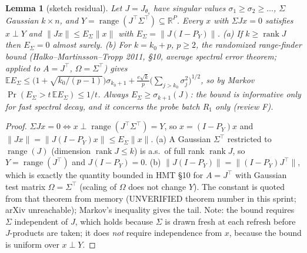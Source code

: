 \documentclass[11pt]{article}
\newtheorem{lemma}[proposition]{Lemma}
\theoremstyle{remark}
\begin{document}
\begin{lemma}[sketch residual]\label{l:sketch}
Let $J=J_{\theta_s}$ have singular values $\sigma_1\ge\sigma_2\ge\dots$, $\Sigma$ Gaussian $k\times n$, and $Y=\operatorname{range}(J^\top\Sigma^\top)\subseteq\mathbb{R}^P$. Every $x$ with $\Sigma Jx=0$ satisfies $x\perp Y$ and
$\|Jx\|\le E_\Sigma\|x\|$ with $E_\Sigma=\|J(I-P_Y)\|$. (a) If $k\ge\operatorname{rank}J$ then $E_\Sigma=0$ almost surely.
(b) For $k=k_0+p$, $p\ge2$, the randomized range-finder bound (Halko--Martinsson--Tropp 2011, \S10, average spectral error
theorem; applied to $A=J^\top$, $\Omega=\Sigma^\top$) gives
$\mathbb{E}E_\Sigma\le\bigl(1+\sqrt{k_0/(p-1)}\bigr)\sigma_{k_0+1}+\frac{e\sqrt{k}}{p}\bigl(\sum_{j>k_0}\sigma_j^2\bigr)^{1/2}$,
so by Markov $\Pr(E_\Sigma>t\,\mathbb{E}E_\Sigma)\le1/t$. Always $E_\Sigma\ge\sigma_{k+1}(J)$: the bound is informative only for fast spectral decay, and it concerns the probe batch $R_1$ only (review F).
\end{lemma}
\begin{proof}
$\Sigma Jx=0\iff x\perp\operatorname{range}(J^\top\Sigma^\top)=Y$, so $x=(I-P_Y)x$ and $\|Jx\|=\|J(I-P_Y)x\|\le E_\Sigma\|x\|$.
(a) A Gaussian $\Sigma^\top$ restricted to $\operatorname{range}(J)$ (dimension $\operatorname{rank}J\le k$) is a.s.\ of full
rank $\operatorname{rank}J$, so $Y=\operatorname{range}(J^\top)$ and $J(I-P_Y)=0$. (b) $\|J(I-P_Y)\|=\|(I-P_Y)J^\top\|$, which is
exactly the quantity bounded in HMT \S10 for $A=J^\top$ with Gaussian test matrix $\Omega=\Sigma^\top$ (scaling of $\Omega$ does
not change $Y$). The constant is quoted from that theorem from memory (UNVERIFIED theorem number in this sprint; arXiv
unreachable); Markov's inequality gives the tail. Note: the bound requires $\Sigma$ independent of $J$, which holds
because $\Sigma$ is drawn fresh at each refresh before $J$-products are taken; it does \emph{not} require independence from
$x$, because the bound is uniform over $x\perp Y$.
\end{proof}
\end{document}

